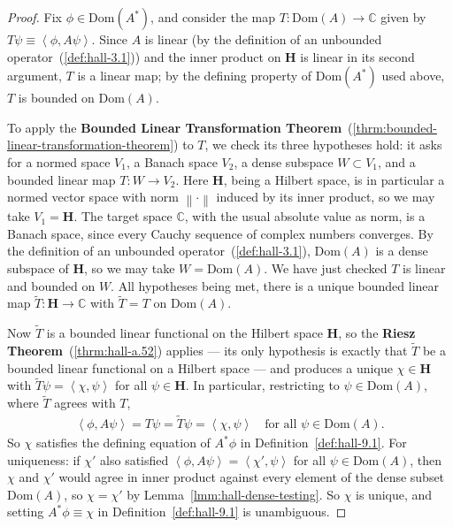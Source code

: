 \begin{proof}
    \leanok
Fix $\phi \in \text{Dom}(A^*)$, and consider the map $T : \text{Dom}(A) \to \mathbb{C}$ given by $T\psi \equiv \left< \phi, A\psi \right>$. Since $A$ is linear (by the definition of an unbounded operator~(\ref{def:hall-3.1})) and the inner product on $\mathbf{H}$ is linear in its second argument, $T$ is a linear map; by the defining property of $\text{Dom}(A^*)$ used above, $T$ is bounded on $\text{Dom}(A)$.

To apply the \textbf{Bounded Linear Transformation Theorem}~(\ref{thrm:bounded-linear-transformation-theorem}) to $T$, we check its three hypotheses hold: it asks for a normed space $V_1$, a Banach space $V_2$, a dense subspace $W \subset V_1$, and a bounded linear map $T : W \to V_2$. Here $\mathbf{H}$, being a Hilbert space, is in particular a normed vector space with norm $\left\| \cdot \right\|$ induced by its inner product, so we may take $V_1 = \mathbf{H}$. The target space $\mathbb{C}$, with the usual absolute value as norm, is a Banach space, since every Cauchy sequence of complex numbers converges. By the definition of an unbounded operator~(\ref{def:hall-3.1}), $\text{Dom}(A)$ is a dense subspace of $\mathbf{H}$, so we may take $W = \text{Dom}(A)$. We have just checked $T$ is linear and bounded on $W$. All hypotheses being met, there is a unique bounded linear map $\tilde{T} : \mathbf{H} \to \mathbb{C}$ with $\tilde{T} = T$ on $\text{Dom}(A)$.

Now $\tilde{T}$ is a bounded linear functional on the Hilbert space $\mathbf{H}$, so the \textbf{Riesz Theorem}~(\ref{thrm:hall-a.52}) applies — its only hypothesis is exactly that $\tilde{T}$ be a bounded linear functional on a Hilbert space — and produces a unique $\chi \in \mathbf{H}$ with $\tilde{T}\psi = \left< \chi, \psi \right>$ for all $\psi \in \mathbf{H}$. In particular, restricting to $\psi \in \text{Dom}(A)$, where $\tilde{T}$ agrees with $T$,
\begin{align}
    \left< \phi, A\psi \right> = T\psi = \tilde{T}\psi = \left< \chi, \psi \right> \quad \text{for all } \psi \in \text{Dom}(A).
\end{align}
So $\chi$ satisfies the defining equation of $A^*\phi$ in Definition~\ref{def:hall-9.1}. For uniqueness: if $\chi'$ also satisfied $\left< \phi, A\psi \right> = \left< \chi', \psi \right>$ for all $\psi \in \text{Dom}(A)$, then $\chi$ and $\chi'$ would agree in inner product against every element of the dense subset $\text{Dom}(A)$, so $\chi = \chi'$ by Lemma~\ref{lmm:hall-dense-testing}. So $\chi$ is unique, and setting $A^*\phi \equiv \chi$ in Definition~\ref{def:hall-9.1} is unambiguous.
\end{proof}

